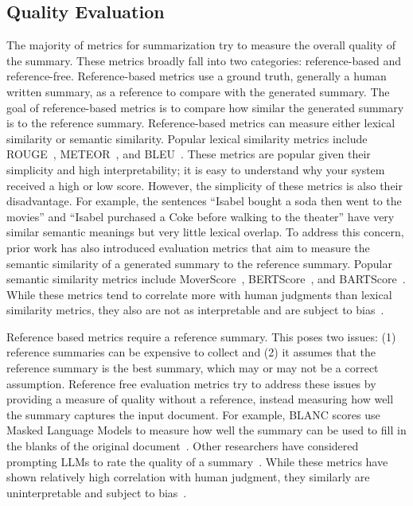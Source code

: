\subsection{Quality Evaluation}
The majority of metrics for summarization try to measure the overall quality of the summary. These metrics broadly fall into two categories: reference-based and reference-free.  Reference-based metrics use a ground truth, generally a human written summary, as a reference to compare with the generated summary. The goal of reference-based metrics is to compare how similar the generated summary is to the reference summary. Reference-based metrics can measure either lexical similarity or semantic similarity. Popular lexical similarity metrics include ROUGE~\cite{lin2004rouge}, METEOR~\cite{banerjee2005meteor}, and BLEU~\cite{papineni2002bleu}. These metrics are popular given their simplicity and high interpretability; it is easy to understand why your system received a high or low score. However, the simplicity of these metrics is also their disadvantage. For example, the sentences ``Isabel bought a soda then went to the movies'' and ``Isabel purchased a Coke before walking to the theater'' have very similar semantic meanings but very little lexical overlap. To address this concern, prior work has also introduced evaluation metrics that aim to measure the semantic similarity of a generated summary to the reference summary. Popular semantic similarity metrics include MoverScore~\cite{zhao2019moverscore}, BERTScore~\cite{zhang2020bertscore}, and BARTScore~\cite{Yuan2021BARTScoreEG}. While these metrics tend to correlate more with human judgments than lexical similarity metrics, they also are not as interpretable and are subject to bias~\cite{Sun2022BERTScoreIU}.

Reference based metrics require a reference summary. This poses two issues: (1) reference summaries can be expensive to collect and (2) it assumes that the reference summary is the best summary, which may or may not be a correct assumption. Reference free evaluation metrics try to address these issues by providing a measure of quality without a reference, instead measuring how well the summary captures the input document. For example, BLANC scores use Masked Language Models to measure how well the summary can be used to fill in the blanks of the original document~\cite{vasilyev2020blanc}. Other researchers have considered prompting LLMs to rate the quality of a summary~\cite{liu2023geval}. While these metrics have shown relatively high correlation with human judgment, they similarly are uninterpretable and subject to bias~\cite{he-etal-2023-blind, Shen2023LargeLM, Liu2023LLMsAN}.

